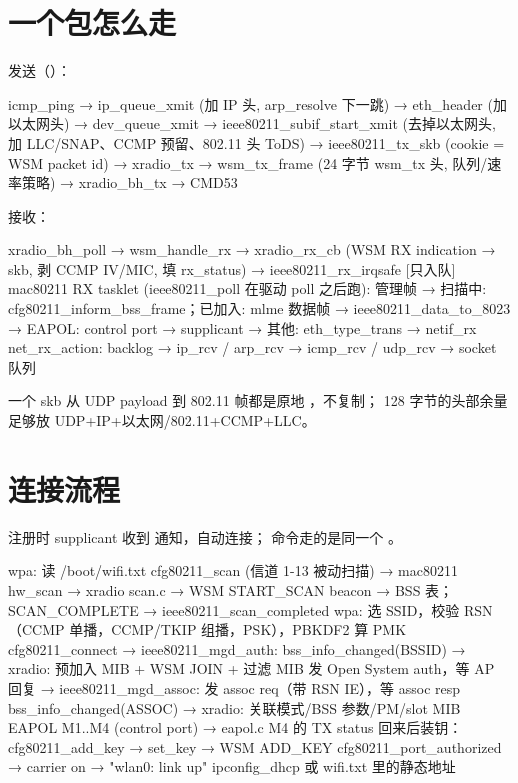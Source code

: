 \section{一个包怎么走}

发送（）：

\begin{txtcode}[basicstyle=\ttfamily\scriptsize]
icmp_ping → ip_queue_xmit (加 IP 头, arp_resolve 下一跳)
  → eth_header (加以太网头) → dev_queue_xmit
  → ieee80211_subif_start_xmit (去掉以太网头, 加 LLC/SNAP、CCMP 预留、802.11 头 ToDS)
  → ieee80211_tx_skb (cookie = WSM packet id) → xradio_tx
  → wsm_tx_frame (24 字节 wsm_tx 头, 队列/速率策略) → xradio_bh_tx → CMD53
\end{txtcode}

接收：

\begin{txtcode}[basicstyle=\ttfamily\scriptsize]
xradio_bh_poll → wsm_handle_rx → xradio_rx_cb
  (WSM RX indication → skb, 剥 CCMP IV/MIC, 填 rx_status)
  → ieee80211_rx_irqsafe  [只入队]
mac80211 RX tasklet (ieee80211_poll 在驱动 poll 之后跑):
  管理帧 → 扫描中: cfg80211_inform_bss_frame；已加入: mlme
  数据帧 → ieee80211_data_to_8023 → EAPOL: control port → supplicant
                                   → 其他: eth_type_trans → netif_rx
net_rx_action: backlog → ip_rcv / arp_rcv → icmp_rcv / udp_rcv → socket 队列
\end{txtcode}

一个 skb 从 UDP payload 到 802.11 帧都是原地 ，不复制； 128 字节的头部余量足够放 UDP+IP+以太网/802.11+CCMP+LLC。

\section{连接流程}

 注册时 supplicant 收到  通知，自动连接； 命令走的是同一个 。

\begin{txtcode}[basicstyle=\ttfamily\scriptsize]
wpa: 读 /boot/wifi.txt
cfg80211_scan (信道 1-13 被动扫描) → mac80211 hw_scan → xradio scan.c → WSM START_SCAN
   beacon → BSS 表；SCAN_COMPLETE → ieee80211_scan_completed
wpa: 选 SSID，校验 RSN（CCMP 单播，CCMP/TKIP 组播，PSK），PBKDF2 算 PMK
cfg80211_connect
   → ieee80211_mgd_auth: bss_info_changed(BSSID) → xradio: 预加入 MIB + WSM JOIN + 过滤 MIB
                          发 Open System auth，等 AP 回复
   → ieee80211_mgd_assoc: 发 assoc req（带 RSN IE），等 assoc resp
                          bss_info_changed(ASSOC) → xradio: 关联模式/BSS 参数/PM/slot MIB
EAPOL M1..M4 (control port) → eapol.c
   M4 的 TX status 回来后装钥：cfg80211_add_key → set_key → WSM ADD_KEY
cfg80211_port_authorized → carrier on → "wlan0: link up"
ipconfig_dhcp 或 wifi.txt 里的静态地址
\end{txtcode}

